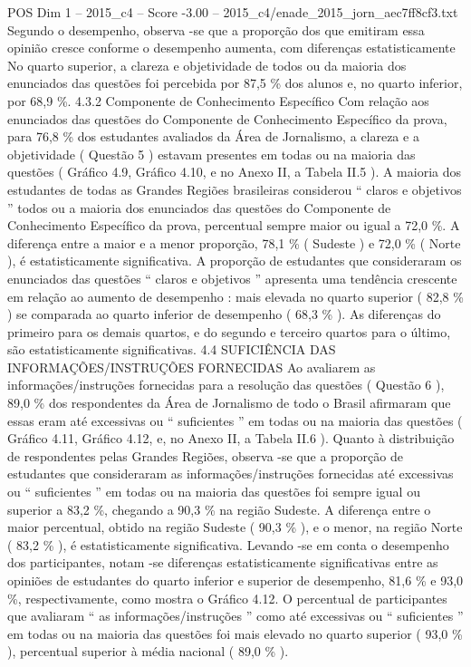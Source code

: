 \begin{textsample}{POS Dim 1 – 2015\_c4 – Score -3.00 – 2015\_c4/enade\_2015\_jorn\_aec7ff8cf3.txt}
Segundo o desempenho, observa -se que a proporção dos que emitiram essa opinião cresce conforme o desempenho aumenta, com diferenças estatisticamente No quarto superior, a clareza e objetividade de todos ou da maioria dos enunciados das questões foi percebida por 87,5 \% dos alunos e, no quarto inferior, por 68,9 \%. 4.3.2 Componente de Conhecimento Específico Com relação aos enunciados das questões do Componente de Conhecimento Específico da prova, para 76,8 \% dos estudantes avaliados da Área de Jornalismo, a clareza e a objetividade ( Questão 5 ) estavam presentes em todas ou na maioria das questões ( Gráfico 4.9, Gráfico 4.10, e no Anexo II, a Tabela II.5 ).
A maioria dos estudantes de todas as Grandes Regiões brasileiras considerou “ claros e objetivos ” todos ou a maioria dos enunciados das questões do Componente de Conhecimento Específico da prova, percentual sempre maior ou igual a 72,0 \%.
A diferença entre a maior e a menor proporção, 78,1 \% ( Sudeste ) e 72,0 \% ( Norte ), é estatisticamente significativa.
A proporção de estudantes que consideraram os enunciados das questões “ claros e objetivos ” apresenta uma tendência crescente em relação ao aumento de desempenho : mais elevada no quarto superior ( 82,8 \% ) se comparada ao quarto inferior de desempenho ( 68,3 \% ).
As diferenças do primeiro para os demais quartos, e do segundo e terceiro quartos para o último, são estatisticamente significativas. 4.4 SUFICIÊNCIA DAS INFORMAÇÕES/INSTRUÇÕES FORNECIDAS Ao avaliarem as informações/instruções fornecidas para a resolução das questões ( Questão 6 ), 89,0 \% dos respondentes da Área de Jornalismo de todo o Brasil afirmaram que essas eram até excessivas ou “ suficientes ” em todas ou na maioria das questões ( Gráfico 4.11, Gráfico 4.12, e, no Anexo II, a Tabela II.6 ).
Quanto à distribuição de respondentes pelas Grandes Regiões, observa -se que a proporção de estudantes que consideraram as informações/instruções fornecidas até excessivas ou “ suficientes ” em todas ou na maioria das questões foi sempre igual ou superior a 83,2 \%, chegando a 90,3 \% na região Sudeste.
A diferença entre o maior percentual, obtido na região Sudeste ( 90,3 \% ), e o menor, na região Norte ( 83,2 \% ), é estatisticamente significativa.
Levando -se em conta o desempenho dos participantes, notam -se diferenças estatisticamente significativas entre as opiniões de estudantes do quarto inferior e superior de desempenho, 81,6 \% e 93,0 \%, respectivamente, como mostra o Gráfico 4.12.
O percentual de participantes que avaliaram “ as informações/instruções ” como até excessivas ou “ suficientes ” em todas ou na maioria das questões foi mais elevado no quarto superior ( 93,0 \% ), percentual superior à média nacional ( 89,0 \% ).

\end{textsample}
